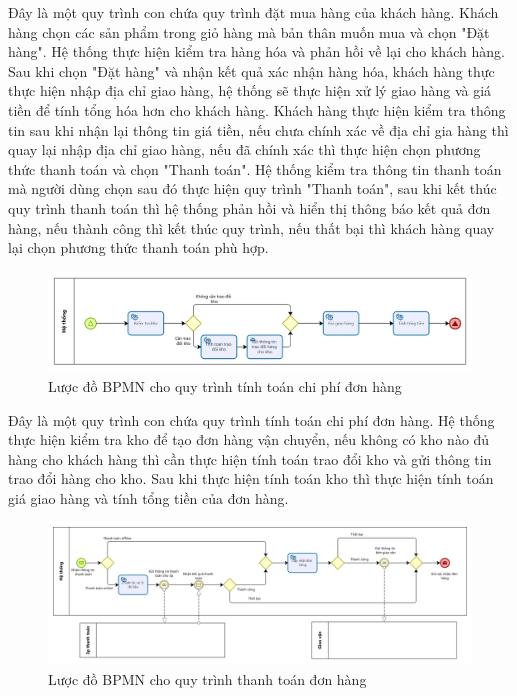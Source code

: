 Đây là một quy trình con chứa quy trình đặt mua hàng của khách hàng. Khách hàng chọn các sản phẩm trong giỏ hàng mà bản thân muốn mua và chọn "Đặt hàng". Hệ thống thực hiện kiểm tra hàng hóa và phản hồi về lại cho khách hàng. Sau khi chọn "Đặt hàng" và nhận kết quả xác nhận hàng hóa, khách hàng thực thực hiện nhập địa chỉ giao hàng, hệ thống sẽ thực hiện xử lý giao hàng và giá tiền để tính tổng hóa hơn cho khách hàng. Khách hàng thực hiện kiểm tra thông tin sau khi nhận lại thông tin giá tiền, nếu chưa chính xác về địa chỉ gia hàng thì quay lại nhập địa chỉ giao hàng, nếu đã chính xác thì thực hiện chọn phương thức thanh toán và chọn "Thanh toán". Hệ thống kiểm tra thông tin thanh toán mà người dùng chọn sau đó thực hiện quy trình "Thanh toán", sau khi kết thúc quy trình thanh toán thì hệ thống phản hồi và hiển thị thông báo kết quả đơn hàng, nếu thành công thì kết thúc quy trình, nếu thất bại thì khách hàng quay lại chọn phương thức thanh toán phù hợp.
 
\begin{figure}[!htp]
    \centering
    \includegraphics[width=5in]{img/BPMN/customer_buy/customer_calc_fee.png}
    \newline
    \caption{Lược đồ BPMN cho quy trình tính toán chi phí đơn hàng}
\end{figure}
 
Đây là một quy trình con chứa quy trình tính toán chi phí đơn hàng. Hệ thống thực hiện kiểm tra kho để tạo đơn hàng vận chuyển, nếu không có kho nào đủ hàng cho khách hàng thì cần thực hiện tính toán trao đổi kho và gửi thông tin trao đổi hàng cho kho. Sau khi thực hiện tính toán kho thì thực hiện tính toán giá giao hàng và tính tổng tiền của đơn hàng.
 
\begin{figure}[!htp]
    \centering
    \includegraphics[width=15cm]{img/BPMN/customer_buy/customer_payment.png}
    \newline
    \caption{Lược đồ BPMN cho quy trình thanh toán đơn hàng}
\end{figure}
 
